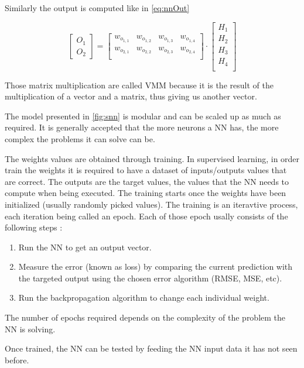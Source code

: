 Similarly the output is computed like in \cref{eq:nnOut}

\begin{equation}\label{eq:nnOut}
  \begin{bmatrix}
    O_1\\ O_2
  \end{bmatrix}
  =
  \begin{bmatrix}
    w_o_{1,1} & w_o_{1,2} & w_o_{1,3} & w_o_{1,4}\\
    w_o_{2,1} & w_o_{2,2} & w_o_{2,3} & w_o_{2,4}\\
  \end{bmatrix}
  \cdot
  \begin{bmatrix}
    H_1\\ H_2\\ H_3\\ H_4\\
  \end{bmatrix}
\end{equation}

Those matrix multiplication are called \ac{VMM} because it is the result of the multiplication of a vector and a matrix, thus giving us another vector.

The model presented in \cref{fig:snn} is modular and can be scaled up as much as required. It is generally accepted that the more neurons a \ac{NN} has, the more complex the problems  it can solve can be.

The weights values are obtained through training. In supervised learning, in order train the weights it is required to have a dataset of inputs/outputs values that are correct. The outputs are the target values, the values that the \ac{NN} needs to compute when being executed. The training starts once the weights have been initialized (usually randomly picked values). The training is an iteravtive process, each iteration being called an epoch. Each of those epoch usally consists of the following steps :

\begin{enumerate}
  \item Run the \ac{NN} to get an output vector.\label{step:restart}
  \item Measure the error (known as loss) by comparing the current prediction with the targeted output using the chosen error algorithm (\ac{RMSE}, \ac{MSE}, etc).
  \item Run the backpropagation algorithm to change each individual weight.
\end{enumerate}

The number of epochs required depends on the complexity of the problem the \ac{NN} is solving.

Once trained, the \ac{NN} can be tested by feeding the \ac{NN} input data it has not seen before.
